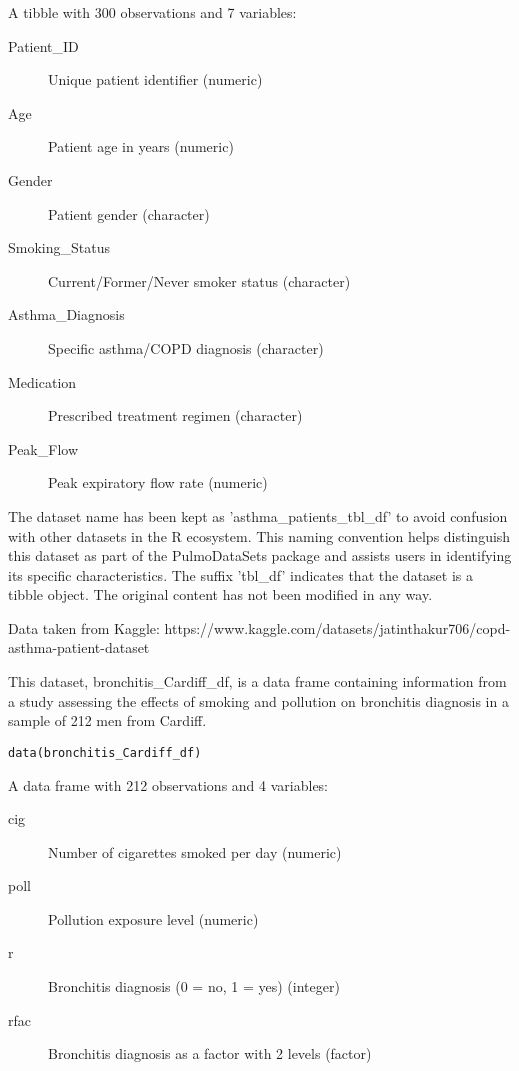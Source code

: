 \documentclass[a4paper]{book}
\begin{document}
\begin{Format}
A tibble with 300 observations and 7 variables:
\begin{description}

\item[Patient\_ID] Unique patient identifier (numeric)
\item[Age] Patient age in years (numeric)
\item[Gender] Patient gender (character)
\item[Smoking\_Status] Current/Former/Never smoker status (character)
\item[Asthma\_Diagnosis] Specific asthma/COPD diagnosis (character)
\item[Medication] Prescribed treatment regimen (character)
\item[Peak\_Flow] Peak expiratory flow rate (numeric)

\end{description}

\end{Format}
%
\begin{Details}
The dataset name has been kept as 'asthma\_patients\_tbl\_df' to avoid confusion with other datasets
in the R ecosystem. This naming convention helps distinguish this dataset as part of the
PulmoDataSets package and assists users in identifying its specific characteristics.
The suffix 'tbl\_df' indicates that the dataset is a tibble object. The original content has not been modified
in any way.
\end{Details}
%
\begin{Source}
Data taken from Kaggle: https://www.kaggle.com/datasets/jatinthakur706/copd-asthma-patient-dataset
\end{Source}
%
\begin{Description}
This dataset, bronchitis\_Cardiff\_df, is a data frame containing information from a study
assessing the effects of smoking and pollution on bronchitis diagnosis in a sample of 212 men
from Cardiff.
\end{Description}
%
\begin{Usage}
\begin{verbatim}
data(bronchitis_Cardiff_df)
\end{verbatim}
\end{Usage}
%
\begin{Format}
A data frame with 212 observations and 4 variables:
\begin{description}

\item[cig] Number of cigarettes smoked per day (numeric)
\item[poll] Pollution exposure level (numeric)
\item[r] Bronchitis diagnosis (0 = no, 1 = yes) (integer)
\item[rfac] Bronchitis diagnosis as a factor with 2 levels (factor)

\end{description}

\end{Format}
\end{document}
